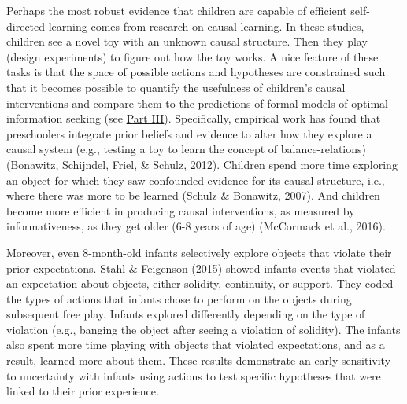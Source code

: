 \documentclass[oneside]{report}
\begin{document}
Perhaps the most robust evidence that children are capable of efficient
self-directed learning comes from research on causal learning. In these
studies, children see a novel toy with an unknown causal structure. Then
they play (design experiments) to figure out how the toy works. A nice
feature of these tasks is that the space of possible actions and
hypotheses are constrained such that it becomes possible to quantify the
usefulness of children's causal interventions and compare them to the
predictions of formal models of optimal information seeking (see
\protect\hyperlink{p3}{Part III}). Specifically, empirical work has
found that preschoolers integrate prior beliefs and evidence to alter
how they explore a causal system (e.g., testing a toy to learn the
concept of balance-relations) (Bonawitz, Schijndel, Friel, \& Schulz,
2012). Children spend more time exploring an object for which they saw
confounded evidence for its causal structure, i.e., where there was more
to be learned (Schulz \& Bonawitz, 2007). And children become more
efficient in producing causal interventions, as measured by
informativeness, as they get older (6-8 years of age) (McCormack et al.,
2016).

Moreover, even 8-month-old infants selectively explore objects that
violate their prior expectations. Stahl \& Feigenson (2015) showed
infants events that violated an expectation about objects, either
solidity, continuity, or support. They coded the types of actions that
infants chose to perform on the objects during subsequent free play.
Infants explored differently depending on the type of violation (e.g.,
banging the object after seeing a violation of solidity). The infants
also spent more time playing with objects that violated expectations,
and as a result, learned more about them. These results demonstrate an
early sensitivity to uncertainty with infants using actions to test
specific hypotheses that were linked to their prior experience.
\end{document}
